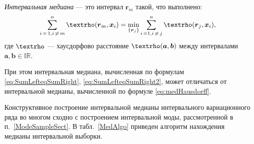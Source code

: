 \documentclass[a5paper,openany]{book}
\renewcommand{\rho}{\text{\textrho}}
\begin{document}
\emph{Интервальная медиана} --- это интервал $\boldsymbol{r}_m$ такой, что выполнено:
\begin{equation} \label{eq:medHausdorff}
\sum_{i\,=\,1,i \, \neq \, m}^{n}\rho(\boldsymbol{r}_m, \boldsymbol{x}_i) = \underset{\{\boldsymbol{r}_j\}}{\min}\sum_{i \,=1,i\, \neq \,j}^{n}\rho(\boldsymbol{r}_j, \boldsymbol{x}_i),
\end{equation}
где $\rho$ --- хаусдорфово расстояние $\rho(\boldsymbol{a}, \boldsymbol{b})$ между интервалами $\boldsymbol{a}, \boldsymbol{b} \in \mathbb{IR}$.

При этом интервальная медиана, вычисленная по формулам \eqref{eq:SumLefteqSumRight}, \eqref{eq:SumLefteqSumRight2}, может отличаться от интервальной медианы, вычисленной по формуле \eqref{eq:medHausdorff}.

Конструктивное построение интервальной медианы интервального вариационного ряда во многом сходно с построением интервальной моды, рассмотренной в п.~\ref{ModeSampleSect}.
В табл.~\ref{MedAlgo} приведен алгоритм нахождения медианы интервальной выборки.

\end{document}
